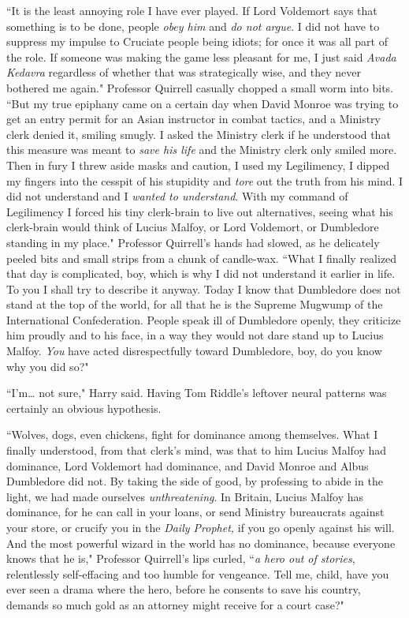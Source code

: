``It is the least annoying role I have ever played. If Lord Voldemort says that something is to be done, people \emph{obey him} and \emph{do not argue}. I did not have to suppress my impulse to Cruciate people being idiots; for once it was all part of the role. If someone was making the game less pleasant for me, I just said \emph{Avada Kedavra} regardless of whether that was strategically wise, and they never bothered me again." Professor Quirrell casually chopped a small worm into bits. ``But my true epiphany came on a certain day when David Monroe was trying to get an entry permit for an Asian instructor in combat tactics, and a Ministry clerk denied it, smiling smugly. I asked the Ministry clerk if he understood that this measure was meant to \emph{save his life} and the Ministry clerk only smiled more. Then in fury I threw aside masks and caution, I used my Legilimency, I dipped my fingers into the cesspit of his stupidity and \emph{tore} out the truth from his mind. I did not understand and I \emph{wanted to understand}. With my command of Legilimency I forced his tiny clerk-brain to live out alternatives, seeing what his clerk-brain would think of Lucius Malfoy, or Lord Voldemort, or Dumbledore standing in my place." Professor Quirrell's hands had slowed, as he delicately peeled bits and small strips from a chunk of candle-wax. ``What I finally realized that day is complicated, boy, which is why I did not understand it earlier in life. To you I shall try to describe it anyway. Today I know that Dumbledore does not stand at the top of the world, for all that he is the Supreme Mugwump of the International Confederation. People speak ill of Dumbledore openly, they criticize him proudly and to his face, in a way they would not dare stand up to Lucius Malfoy. \emph{You} have acted disrespectfully toward Dumbledore, boy, do you know why you did so?"

``I'm{\ldots} not sure," Harry said. Having Tom Riddle's leftover neural patterns was certainly an obvious hypothesis.

``Wolves, dogs, even chickens, fight for dominance among themselves. What I finally understood, from that clerk's mind, was that to him Lucius Malfoy had dominance, Lord Voldemort had dominance, and David Monroe and Albus Dumbledore did not. By taking the side of good, by professing to abide in the light, we had made ourselves \emph{unthreatening}. In Britain, Lucius Malfoy has dominance, for he can call in your loans, or send Ministry bureaucrats against your store, or crucify you in the \emph{Daily Prophet,} if you go openly against his will. And the most powerful wizard in the world has no dominance, because everyone knows that he is," Professor Quirrell's lips curled, ``\emph{a hero out of stories}, relentlessly self-effacing and too humble for vengeance. Tell me, child, have you ever seen a drama where the hero, before he consents to save his country, demands so much gold as an attorney might receive for a court case?"

